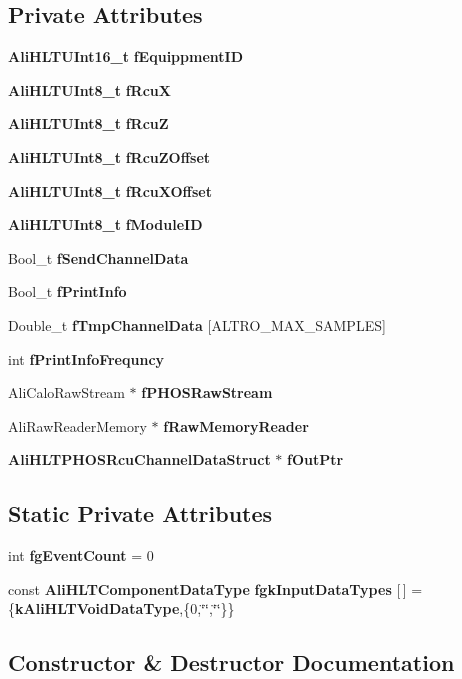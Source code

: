 \subsection*{Private Attributes}
\begin{CompactItemize}
\item 
{\bf Ali\-HLTUInt16\_\-t} {\bf f\-Equippment\-ID}
\item 
{\bf Ali\-HLTUInt8\_\-t} {\bf f\-Rcu\-X}
\item 
{\bf Ali\-HLTUInt8\_\-t} {\bf f\-Rcu\-Z}
\item 
{\bf Ali\-HLTUInt8\_\-t} {\bf f\-Rcu\-ZOffset}
\item 
{\bf Ali\-HLTUInt8\_\-t} {\bf f\-Rcu\-XOffset}
\item 
{\bf Ali\-HLTUInt8\_\-t} {\bf f\-Module\-ID}
\item 
Bool\_\-t {\bf f\-Send\-Channel\-Data}
\item 
Bool\_\-t {\bf f\-Print\-Info}
\item 
Double\_\-t {\bf f\-Tmp\-Channel\-Data} [ALTRO\_\-MAX\_\-SAMPLES]
\item 
int {\bf f\-Print\-Info\-Frequncy}
\item 
Ali\-Calo\-Raw\-Stream $\ast$ {\bf f\-PHOSRaw\-Stream}
\item 
Ali\-Raw\-Reader\-Memory $\ast$ {\bf f\-Raw\-Memory\-Reader}
\item 
{\bf Ali\-HLTPHOSRcu\-Channel\-Data\-Struct} $\ast$ {\bf f\-Out\-Ptr}
\end{CompactItemize}
\subsection*{Static Private Attributes}
\begin{CompactItemize}
\item 
int {\bf fg\-Event\-Count} = 0
\item 
const {\bf Ali\-HLTComponent\-Data\-Type} {\bf fgk\-Input\-Data\-Types} [$\,$] = \{{\bf k\-Ali\-HLTVoid\-Data\-Type},\{0,\char`\"{}\char`\"{},\char`\"{}\char`\"{}\}\}
\end{CompactItemize}


\subsection{Constructor \& Destructor Documentation}
